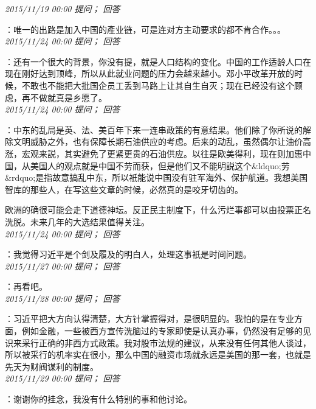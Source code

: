 \documentclass[twocolumn]{ctexart}
\begin{document}
\textit{\hfill\noindent\small 2015/11/19 00:00 提问； 回答}

：唯一的出路是加入中国的產业链，可是连对方主动要求的都不肯合作。。。\\

\textit{\hfill\noindent\small 2015/11/24 00:00 提问； 回答}

：还有一个很大的背景，你没有提，就是人口结构的变化。中国的工作适龄人口在现在刚好达到顶峰，所以从此就业问题的压力会越来越小。邓小平改革开放的时候，不敢也不能把大批国企员工丢到马路上让其自生自灭；现在已经没有这个顾虑，再不做就真是乡愿了。\\

\textit{\hfill\noindent\small 2015/11/24 00:00 提问； 回答}

：中东的乱局是英、法、美百年下来一连串政策的有意结果。他们除了你所说的解除文明威胁之外，也有保障长期石油供应的考虑。后来的动乱，虽然偶尔让油价高涨，宏观来説，其实避免了更紧更贵的石油供应。以往是欧美得利，现在则加惠中国，从美国人的观点就是中国不劳而获，但是他们又不能明説这个\&ldquo;劳\&rdquo;是指故意搞乱中东，所以衹能说中国没有驻军海外、保护航道。我想美国智库的那些人，在写这些文章的时候，必然真的是咬牙切齿的。

欧洲的确很可能会走下道德神坛。反正民主制度下，什么污烂事都可以由投票正名洗脱。未来几年的大选结果值得关注。\\

\textit{\hfill\noindent\small 2015/11/24 00:00 提问； 回答}

：我觉得习近平是个剑及履及的明白人，处理这事衹是时间问题。\\

\textit{\hfill\noindent\small 2015/11/27 00:00 提问； 回答}

：再看吧。\\

\textit{\hfill\noindent\small 2015/11/28 00:00 提问； 回答}

：习近平把大方向认得清楚，大方针掌握得对，是很明显的。我怕的是在专业方面，例如金融，一些被西方宣传洗脑过的专家即使是认真办事，仍然没有足够的见识来采行正确的非西方式政策。我对股市法规的建议，从来没有任何其他人谈过，所以被采行的机率实在很小，那么中国的融资市场就永远是美国的那一套，也就是先天为财阀谋利的制度。\\

\textit{\hfill\noindent\small 2015/11/29 00:00 提问； 回答}

：谢谢你的挂念，我没有什么特别的事和他讨论。\\
\end{document}
